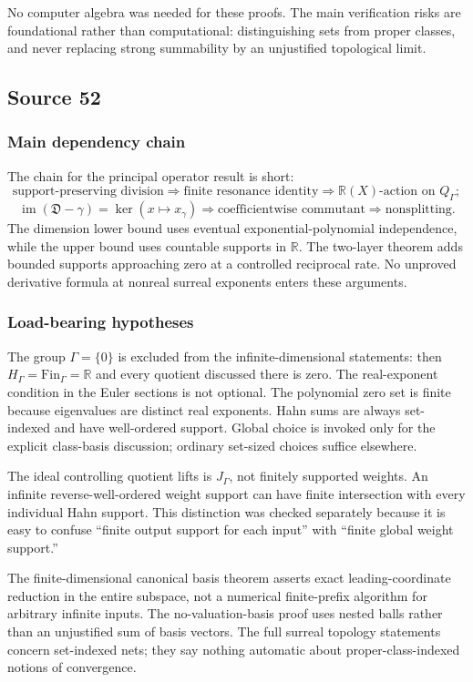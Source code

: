 \documentclass[11pt,letterpaper]{article}
\numberwithin{equation}{section}
\theoremstyle{definition}
\theoremstyle{remark}
\newcommand{\R}{\mathbb{R}}
\newcommand{\im}{\operatorname{im}}
\newcommand{\EuD}{\mathfrak D}%
\newcommand{\FinS}[1]{\mathrm{Fin}_{#1}}%
\begin{document}
No computer algebra was needed for these proofs.  The main verification risks
are foundational rather than computational: distinguishing sets from proper
classes, and never replacing strong summability by an unjustified topological
limit.

\subsection{Source 52}

\subsubsection{Main dependency chain}
The chain for the principal operator result is short:
\[
 \text{support-preserving division}
 \Longrightarrow \text{finite resonance identity}
 \Longrightarrow \R(X)\text{-action on }Q_\Gamma;
\]
\[
 \im(\EuD-\gamma)=\ker(x\mapsto x_\gamma)
 \Longrightarrow \text{coefficientwise commutant}
 \Longrightarrow \text{nonsplitting}.
\]
The dimension lower bound uses eventual exponential-polynomial independence, while the upper bound uses countable supports in $\R$. The two-layer theorem adds bounded supports approaching zero at a controlled reciprocal rate. No unproved derivative formula at nonreal surreal exponents enters these arguments.

\subsubsection{Load-bearing hypotheses}
The group $\Gamma=\{0\}$ is excluded from the infinite-dimensional statements: then $H_\Gamma=\FinS{\Gamma}=\R$ and every quotient discussed there is zero. The real-exponent condition in the Euler sections is not optional. The polynomial zero set is finite because eigenvalues are distinct real exponents. Hahn sums are always set-indexed and have well-ordered support. Global choice is invoked only for the explicit class-basis discussion; ordinary set-sized choices suffice elsewhere.

The ideal controlling quotient lifts is $J_\Gamma$, not finitely supported weights. An infinite reverse-well-ordered weight support can have finite intersection with every individual Hahn support. This distinction was checked separately because it is easy to confuse ``finite output support for each input'' with ``finite global weight support.''

The finite-dimensional canonical basis theorem asserts exact leading-coordinate reduction in the entire subspace, not a numerical finite-prefix algorithm for arbitrary infinite inputs. The no-valuation-basis proof uses nested balls rather than an unjustified sum of basis vectors. The full surreal topology statements concern set-indexed nets; they say nothing automatic about proper-class-indexed notions of convergence.
\end{document}
